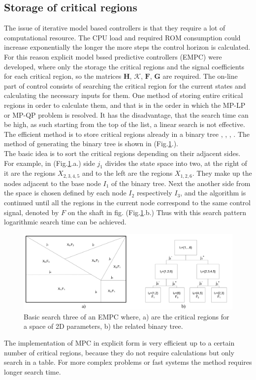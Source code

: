 \subsection{Storage of critical regions}\label{BASICCSR:sec:EMPCStorage}

The issue of iterative model based controllers is that they require a lot of computational resource. The CPU load and required ROM consumption could increase exponentially the longer the more steps the control horizon is calculated. For this reason explicit model bssed predictive controllers (EMPC) were developed, where only the storage the critical regions and the signal coefficients for each critical region, so the matrices $\textbf{H}$, $\mathcal{K}$, $\textbf{F}$, $\textbf{G}$ are required. The on-line part of control consists of searching the critical region for the current states and calculating the necessary inputs for them.
One method of storing entire critical regions in order to calculate them, and that is in the order in which the MP-LP or MP-QP problem is resolved. It has the disadvantage, that the search time can be high, as such starting from the top of the list, a linear search is not effective. The efficient method is to store critical regions already in a binary tree \cite{jones2006logarithmic}, \cite{tondel2003evaluation}, \cite{tondel2003constrained}, \cite{kutasi2008vector}. The method of generating the binary tree is shown in (Fig.\ref{BASICMPC:fig:searchtree}.).\\
 The basic idea is to sort the critical regions depending on their adjacent sides. For example, in (Fig.\ref{BASICMPC:fig:searchtree}.a.) side $j_1$ divides the state space into two, at the right of it are the regions $X_{2,3,4,5}$ and to the left are the regions $X_{1,2,6}$. They make up the nodes adjacent to the base node $I_1$ of the binary tree. Next the another side from the space is chosen defined by each node $I_2$ respectively $I_3$, and the algorithm is continued until all the regions in the current node correspond to the same control signal, denoted by $F$ on the shaft in fig. (Fig.\ref{BASICMPC:fig:searchtree}.b.) Thus with this search pattern logarithmic search time can be achieved.

 \begin{figure}[!ht]
        \centering
        \includegraphics[width=\textwidth]{EMPC_PNG_Pics/BasicSearchTree.png}
        \caption{Basic search three of an EMPC where, a) are the critical regions for a space of 2D parameters,
b) the related binary tree.}
        \label{BASICMPC:fig:searchtree}
    \end{figure}

The implementation of MPC in explicit form is very efficient up to a certain number of critical regions, because they do not require calculations but only search in a table. For more complex problems or fast systems the method requires longer search time.
